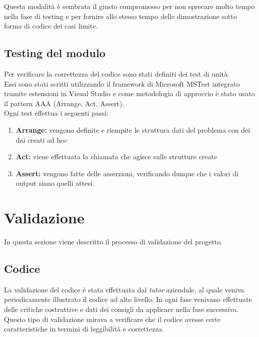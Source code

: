 \noindent Questa modalità è sembrata il giusto compromesso per non sprecare molto tempo nella
fase di testing e per fornire allo stesso tempo delle dimostrazione sotto forma di
codice dei casi limite.

\subsection{Testing del modulo}
\noindent Per verificare la correttezza del codice sono stati definiti dei test di unità.\\
Essi sono stati scritti utilizzando il framework di Microsoft MSTest integrato tramite estensioni
in Visual Studio e come metodologia di approccio è stato usato il pattern AAA (Arrange, Act, Assert).\\
Ogni test effettua i seguenti passi:
\begin{enumerate}
    \item \textbf{Arrange:} vengono definite e riempite le struttura dati del problema con dei
    dai creati ad hoc 
    \item \textbf{Act:} viene effettuata la chiamata che agisce sulle strutture create
    \item \textbf{Assert:} vengono fatte delle asserzioni, verificando dunque che i valori di output 
    siano quelli attesi
\end{enumerate}





\section{Validazione}
\noindent In questa sezione viene descritto il processo di validazione del progetto.
\subsection{Codice}
\noindent La validazione del codice è stata effettuata dal \textit{tutor} aziendale,
al quale veniva periodicamente illustrato il codice ad alto livello.
In ogni fase venivano effettuate delle critiche costruttive e dati dei consigli
da applicare nella fase successiva. Questo tipo di validazione mirava a verificare che il codice avesse certe caratteristiche in termini di leggibilità e correttezza.

